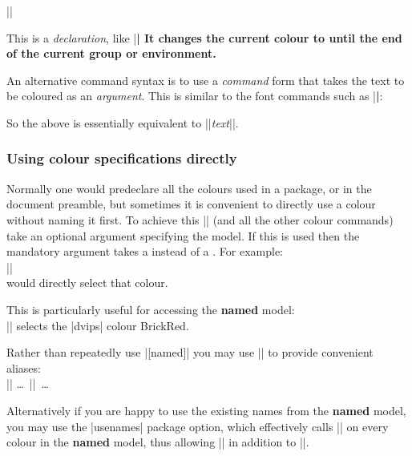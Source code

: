 \begin{decl}
|\color|
\end{decl}

This is a \emph{declaration}, like |\bfseries| It changes the current
colour to  until the end of the current group or
environment.

An alternative command syntax is to use a \emph{command} form that
takes the text to be coloured as an \emph{argument}. This is similar
to the font commands such as |\textbf|:



So the above is essentially equivalent to
|{\color|\emph{text}|}|.

\subsubsection{Using colour specifications directly}



Normally one would predeclare all the colours used in a package, or in
the document preamble, but sometimes it is convenient to directly use
a colour without naming it first. To achieve this |\color| (and all
the other colour commands) take an optional argument specifying the
model. If this is used then the mandatory argument takes a
 instead of a . For example:\\
|\color[rgb]{1,0.2,0.3}|\\
would directly select that colour.

This is particularly useful for accessing the \textbf{named} model:\\
|\color[named]{BrickRed}| selects the |dvips| colour BrickRed.

Rather than repeatedly use |[named]| you may use |\definecolor| to
provide convenient aliases:\\
||
     \ldots\ |\color{myred}|\ \ldots

Alternatively if you are happy to use the existing names from the
\textbf{named} model, you may use the |usenames| package option, which
effectively calls |\definecolor| on every colour in the \textbf{named}
model, thus allowing |\color{WildStrawberry}| in addition to
|\color[named]{WildStrawbery}|.

